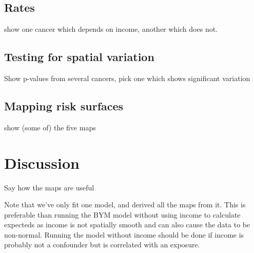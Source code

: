 \documentclass[12pt]{article}
\begin{document}
\subsection{Rates}

show one cancer which depends on income, another which does not.

\subsection{Testing for spatial variation}

Show p-values from several cancers, pick one which shows significant variation

\subsection{Mapping risk surfaces}

show (some of) the five maps 




\section{Discussion}

Say how the maps are useful

Note that we've only fit one model, and derived all the maps from it.  This is preferable than running the BYM model without using income to calculate expecteds as income is not spatially smooth and can also cause the data to be non-normal.  Running the model without income should be done if income is probably not a confounder but is correlated with an exposure.  
\end{document}
